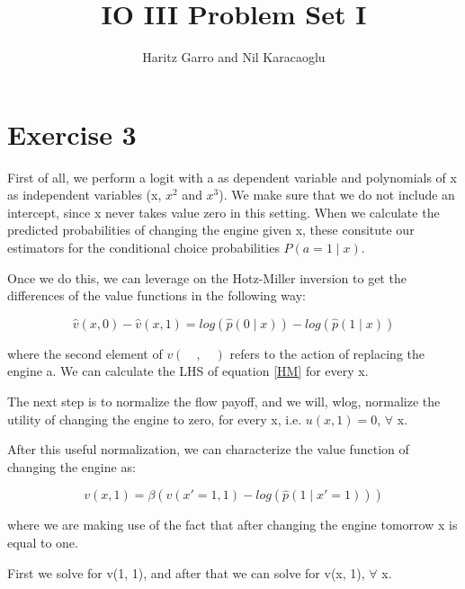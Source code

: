 \documentclass[12 pt]{article}
\title{IO III Problem Set I}
\author{Haritz Garro and Nil Karacaoglu}
\begin{document}
\maketitle

\section{Exercise 3}

First of all, we perform a logit with a as dependent variable and polynomials of x as independent variables (x, $x^2$ and $x^3$). We make sure that we do not include an intercept, since x never takes value zero in this setting. When we calculate the predicted probabilities of changing the engine given x, these consitute our estimators for the conditional choice probabilities $P(a = 1 \mid x)$.

Once we do this, we can leverage on the Hotz-Miller inversion to get the differences of the value functions in the following way:

\begin{equation}\label{HM}
\hat{v}(x, 0) - \hat{v}(x, 1) = log(\hat{p}(0 \mid x)) - log(\hat{p}(1 \mid x)) 
\end{equation}

where the second element of $v(\quad,\quad)$ refers to the action of replacing the engine a. We can calculate the LHS of equation \ref{HM} for every x.

The next step is to normalize the flow payoff, and we will, wlog, normalize the utility of changing the engine to zero, for every x, i.e. $u(x, 1) = 0$, $\forall$ x.

After this useful normalization, we can characterize the value function of changing the engine as:

$$v(x, 1) = \beta \left(v(x'=1, 1) - log(\hat{p}(1 \mid x'=1)) \right) $$ 

where we are making use of the fact that after changing the engine tomorrow x is equal to one.

First we solve for v(1, 1), and after that we can solve for v(x, 1), $\forall$ x.
\end{document}

